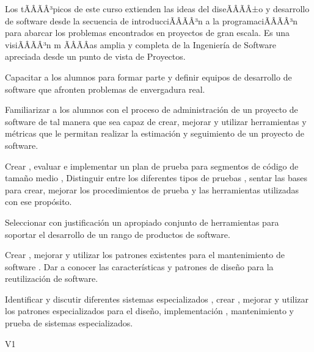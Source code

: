 \begin{syllabus}


\begin{justification}
Los tÃÂÃÂ³picos de este curso extienden las ideas del diseÃÂÃÂ±o y desarrollo de software desde la secuencia de introducciÃÂÃÂ³n
a la programaciÃÂÃÂ³n para abarcar los problemas encontrados en proyectos de gran escala. Es una visiÃÂÃÂ³n m ÃÂÃÂas amplia y
completa de la Ingenierí­a de Software apreciada desde un punto de vista de Proyectos.
\end{justification}

\begin{goals}
    \item Capacitar a los alumnos para formar parte y definir equipos de desarrollo de software que afronten problemas de envergadura real.
    \item Familiarizar a los alumnos con el proceso de administración de un proyecto de software de tal manera que sea capaz de crear, mejorar y utilizar herramientas y métricas que le permitan realizar la estimación y seguimiento de un proyecto de software.
    \item Crear , evaluar e implementar un plan de prueba para segmentos de código de tamaño medio , Distinguir entre los diferentes tipos de pruebas , sentar las bases para crear, mejorar los procedimientos de prueba y las herramientas utilizadas con ese propósito.
    \item Seleccionar con justificación un apropiado conjunto de herramientas para soportar el desarrollo de un rango de productos de software.
    \item Crear , mejorar y utilizar los patrones existentes para el mantenimiento de software . Dar a conocer las caracterí­sticas y patrones de diseño para la reutilización de software.
    \item Identificar y discutir diferentes sistemas especializados , crear , mejorar y utilizar los patrones especializados para el diseño, implementación , mantenimiento y prueba de sistemas especializados.
\end{goals}

\begin{outcomes}{V1}
    \item {}
    \item {}
	\item {}
	\item {}
	\item {}
\end{outcomes}


\end{syllabus}
